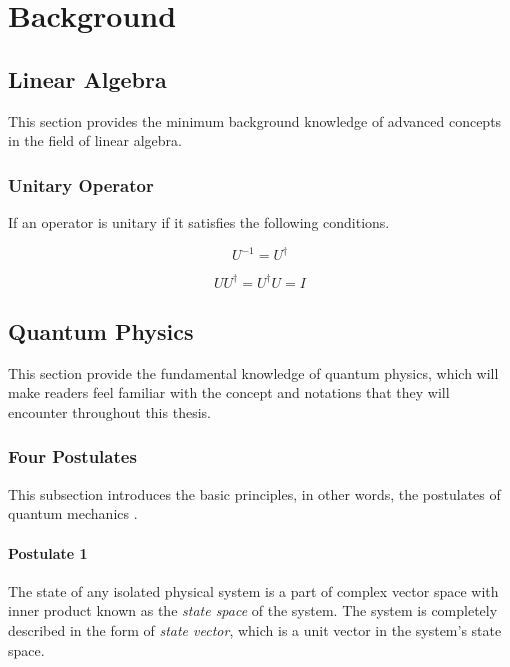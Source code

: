\chapter{Background}
\label{background}

\section{Linear Algebra}

This section provides the minimum background knowledge of advanced concepts in the field of linear algebra.

\subsection{Unitary Operator}
\label{background:linear-algebra:unitary-operator}

If an operator is unitary if it satisfies the following conditions.

\begin{equation}
  U^{-1} = U^{\dagger}
\end{equation}

\begin{equation}
  UU^{\dagger} = U^{\dagger}U = I
\end{equation}

\section{Quantum Physics}

This section provide the fundamental knowledge of quantum physics, which will make readers feel familiar with the concept and notations that they will encounter throughout this thesis.

\subsection{Four Postulates}

This subsection introduces the basic principles, in other words, the postulates of quantum mechanics \cite{10.5555/1972505}.

\subsubsection{Postulate 1}

The state of any isolated physical system is a part of complex vector space with inner product known as the \textit{state space} of the system.
The system is completely described in the form of \textit{state vector}, which is a unit vector in the system's state space.

